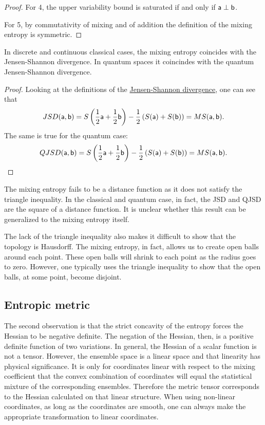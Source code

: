 \begin{mathSection}
\begin{proof}
	For 4, the upper variability bound is saturated if and only if $\ens[a] \ortho \ens[b]$.
	
	For 5, by commutativity of mixing and of addition the definition of the mixing entropy is symmetric.
\end{proof}

\begin{prop}
	In discrete and continuous classical cases, the mixing entropy coincides with the Jensen-Shannon divergence. In quantum spaces it coincindes with the quantum Jensen-Shannon divergence.
\end{prop}

\begin{proof}
	Looking at the definitions of the \href{https://en.wikipedia.org/wiki/Jensen%E2%80%93Shannon_divergence}{Jensen-Shannon divergence}, one can see that
	$$ JSD(\ens[a], \ens[b]) = S\left(\frac{1}{2}\ens[a] + \frac{1}{2}\ens[b] \right)  - \frac{1}{2} \left(S(\ens[a]) + S(\ens[b])\right) = MS(\ens[a], \ens[b]).$$
	The same is true for the quantum case:
	$$ QJSD(\ens[a], \ens[b]) = S\left(\frac{1}{2}\ens[a] + \frac{1}{2}\ens[b] \right)  - \frac{1}{2} \left(S(\ens[a]) + S(\ens[b])\right) = MS(\ens[a], \ens[b]).$$
\end{proof}

\begin{remark}
	The mixing entropy fails to be a distance function as it does not satisfy the triangle inequality. In the classical and quantum case, in fact, the JSD and QJSD are the square of a distance function. It is unclear whether this result can be generalized to the mixing entropy itself.
	
	The lack of the triangle inequality also makes it difficult to show that the topology is Hausdorff. The mixing entropy, in fact, allows us to create open balls around each point. These open balls will shrink to each point as the radius goes to zero. However, one typically uses the triangle inequality to show that the open balls, at some point, become disjoint.
\end{remark}
\end{mathSection}

\subsection{Entropic metric}

The second observation is that the strict concavity of the entropy forces the Hessian to be negative definite. The negation of the Hessian, then, is a positive definite function of two variations. In general, the Hessian of a scalar function is not a tensor. However, the ensemble space is a linear space and that linearity has physical significance. It is only for coordinates linear with respect to the mixing coefficient that the convex combination of coordinates will equal the statistical mixture of the corresponding ensembles. Therefore the metric tensor corresponds to the Hessian calculated on that linear structure. When using non-linear coordinates, as long as the coordinates are smooth, one can always make the appropriate transformation to linear coordinates.

